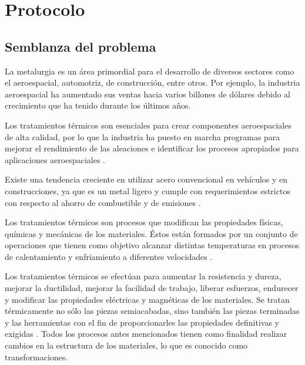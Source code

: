 \chapter{Protocolo} %
\label{ch:protocolo} 

\section{Semblanza del problema}

La metalurgia es un área primordial para el desarrollo de diversos sectores como el aeroespacial, automotriz, de construcción, entre otros. Por ejemplo, la industria aeroespacial ha aumentado sus ventas hacia varios billones de dólares debido al crecimiento que ha tenido durante los últimos años.

Los tratamientos térmicos son esenciales para crear componentes aeroespaciales de alta calidad, por lo que
la industria ha puesto en marcha programas para mejorar el rendimiento de las aleaciones e identificar los procesos apropiados para aplicaciones aeroespaciales \cite{BREWER1998}.

Existe una tendencia creciente en utilizar acero convencional en vehículos y en construcciones, ya que es un metal ligero y cumple con requerimientos estrictos con respecto al ahorro de combustible y de emisiones  \cite{cole1995light}.
 




Los tratamientos térmicos son procesos que modifican las propiedades físicas, químicas y mecánicas de los materiales. 
Éstos están formados por un conjunto de operaciones que tienen como objetivo alcanzar distintas temperaturas en procesos de calentamiento y enfriamiento a diferentes velocidades \cite{moleraTratamientosMarcomo}.
 
Los tratamientos térmicos se efectúan para aumentar la resistencia y dureza, mejorar la ductilidad, mejorar la facilidad de trabajo, liberar esfuerzos, endurecer  y modificar las propiedades eléctricas y magnéticas de los materiales.
Se tratan térmicamente no sólo las piezas semiacabadas, %
sino también las piezas terminadas y las herramientas con el fin de proporcionarles las propiedades definitivas y exigidas \cite{TratamientosAcerosTesis}.
Todos los procesos  antes mencionados tienen como finalidad realizar cambios en la estructura de los materiales, lo que es conocido como transformaciones.


